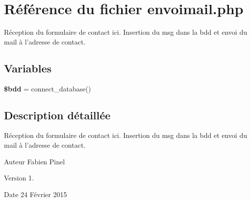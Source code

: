 \hypertarget{envoimail_8php}{\section{Référence du fichier envoimail.\-php}
\label{envoimail_8php}
}


Réception du formulaire de contact ici. Insertion du msg dans la bdd et envoi du mail à l'adresse de contact.  


\subsection*{Variables}
\begin{DoxyCompactItemize}
\item 
\hypertarget{envoimail_8php_a94f91e878bce0991e2cd595c5dd79b3f}{{\bfseries \$bdd} = connect\-\_\-database()}\label{envoimail_8php_a94f91e878bce0991e2cd595c5dd79b3f}

\end{DoxyCompactItemize}


\subsection{Description détaillée}
Réception du formulaire de contact ici. Insertion du msg dans la bdd et envoi du mail à l'adresse de contact. \begin{DoxyAuthor}{Auteur}
Fabien Pinel 
\end{DoxyAuthor}
\begin{DoxyVersion}{Version}
1. 
\end{DoxyVersion}
\begin{DoxyDate}{Date}
24 Février 2015 
\end{DoxyDate}
